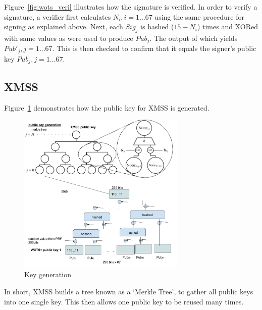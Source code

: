 \documentclass[a4paper,10pt,twocolumn]{article}
\begin{document}
	\vspace{-3.5mm}
	
	 Figure~\ref{fig:wots_veri} illustrates how the signature is verified. In order to verify a signature, a verifier first calculates \(N_i, i=1 \ldots 67 \) using the same procedure for signing as explained 
	 above. Next, each \( Sig_j \) is hashed (\(15-N_i\)) times and XORed with same values as were used to produce \( Pub_{j} \). The output 
	 of which yields \( Pub'_j , j=1 \ldots 67\). This is then checked to confirm that it equals the signer's public key \( Pub_j,  j=1 
	 \ldots 67 \).
	
	\newpage
	
	\subsection{XMSS}
	
	Figure~\ref{fig:xmss_pub} demonstrates how the public key for XMSS is generated.
	
	\begin{figure}[ht]
		\begin{center}
		\includegraphics[width=80mm]{xmss_pub.png}
		  \caption{Key generation}
		\label{fig:xmss_pub}
		\end{center}
	 \end{figure}
	
	\vspace{-3.5mm}
	
	In short, XMSS builds a tree known as a `Merkle Tree',
	to gather all public keys into one single key. This then allows one public key to be reused many times.
	
	\vspace{2.5mm}
	
\end{document}
